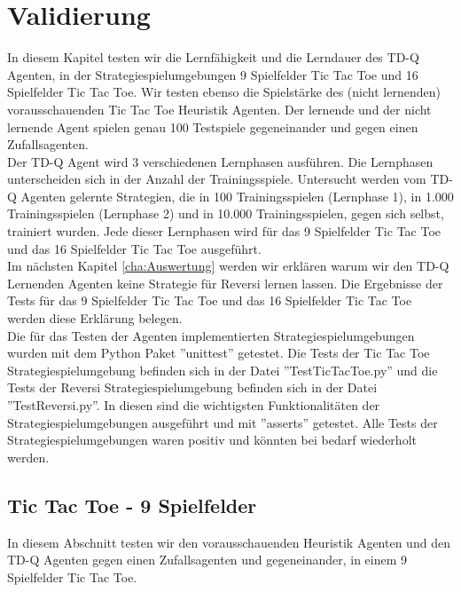 \chapter{Validierung}
\label{cha:Validierung}

In diesem Kapitel testen wir die Lernfähigkeit und die Lerndauer des TD-Q Agenten, in der Strategiespielumgebungen 9 Spielfelder Tic Tac Toe und 16 Spielfelder Tic Tac Toe. Wir testen ebenso die Spielstärke des (nicht lernenden) vorausschauenden Tic Tac Toe Heuristik Agenten. Der lernende und der nicht lernende Agent spielen genau 100 Testspiele gegeneinander und gegen einen Zufallsagenten. \\

Der TD-Q Agent wird 3 verschiedenen Lernphasen ausführen. Die Lernphasen unterscheiden sich in der Anzahl der Trainingsspiele. Untersucht werden vom TD-Q Agenten gelernte Strategien, die in 100 Trainingsspielen (Lernphase 1), in 1.000 Trainingsspielen (Lernphase 2) und in 10.000 Trainingsspielen, gegen sich selbst, trainiert wurden. Jede dieser Lernphasen wird für das 9 Spielfelder Tic Tac Toe und das 16 Spielfelder Tic Tac Toe ausgeführt. \\

Im nächsten Kapitel \ref{cha:Auswertung} werden wir erklären warum wir den TD-Q Lernenden Agenten keine Strategie für Reversi lernen lassen. Die Ergebnisse der Tests für das 9 Spielfelder Tic Tac Toe und das 16 Spielfelder Tic Tac Toe werden diese Erklärung belegen. \\

Die für das Testen der Agenten implementierten Strategiespielumgebungen wurden mit dem Python Paket ''unittest'' getestet. Die Tests der Tic Tac Toe Strategiespielumgebung befinden sich in der Datei ''TestTicTacToe.py'' und die Tests der Reversi Strategiespielumgebung befinden sich in der Datei ''TestReversi.py''. In diesen sind die wichtigsten Funktionalitäten der Strategiespielumgebungen ausgeführt und mit ''asserts'' getestet. Alle Tests der Strategiespielumgebungen waren positiv und könnten bei bedarf wiederholt werden. \\

\section{Tic Tac Toe - 9 Spielfelder}
In diesem Abschnitt testen wir den vorausschauenden Heuristik Agenten und den TD-Q Agenten gegen einen Zufallsagenten und gegeneinander, in einem 9 Spielfelder Tic Tac Toe. 

